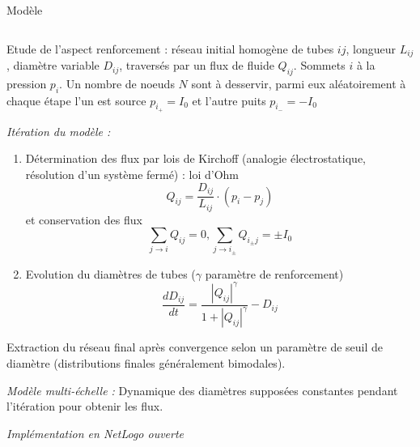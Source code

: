 \documentclass{beamer}
\begin{document}
\begin{frame}{}
\begin{columns}[t]
\begin{column}{.49\textwidth}
\begin{block}{Modèle}
\begin{columns}[t]
\begin{column}{.95\textwidth}
\begin{justify}
          \bigskip
          
          Etude de l'aspect renforcement : réseau initial homogène de tubes $ij$, longueur $L_{ij}$, diamètre variable $D_{ij}$, traversés par un flux de fluide $Q_{ij}$. Sommets $i$ à la pression $p_i$. Un nombre de noeuds $N$ sont à desservir, parmi eux aléatoirement à chaque étape l'un est source $p_{i_+}=I_0$ et l'autre puits $p_{i_-}=-I_0$
          
          
          \bigskip
          \textit{Itération du modèle :}
          \begin{enumerate}
          \item Détermination des flux par lois de Kirchoff (analogie électrostatique, résolution d'un système fermé) : loi d'Ohm
          \begin{equation}
Q_{ij}=\frac{D_{ij}}{L_{ij}}\cdot(p_{i}-p_{j})
\end{equation}
et conservation des flux
\begin{equation}
\sum_{j\rightarrow i}Q_{ij} = 0 , \sum_{j\rightarrow i_\pm}Q_{i_{\pm}j} = \pm I_0
\end{equation}



\item Evolution du diamètres de tubes ($\gamma$ paramètre de renforcement)
\begin{equation}
\frac{dD_{ij}}{dt}=\frac{\left|Q_{ij}\right|^{\gamma}}{1+\left|Q_{ij}\right|^{\gamma}}-D_{ij}
\end{equation}
          \end{enumerate}

\bigskip

Extraction du réseau final après convergence selon un paramètre de seuil de diamètre (distributions finales généralement bimodales).

\bigskip 

\textit{Modèle multi-échelle :} Dynamique des diamètres supposées constantes pendant l'itération pour obtenir les flux. 

\bigskip 

\textit{Implémentation en NetLogo ouverte~\cite{impl}}
\end{justify}
          \end{column}
          \end{columns}
        \end{block}
        

\end{column}
\end{columns}
\end{frame}
\end{document}
